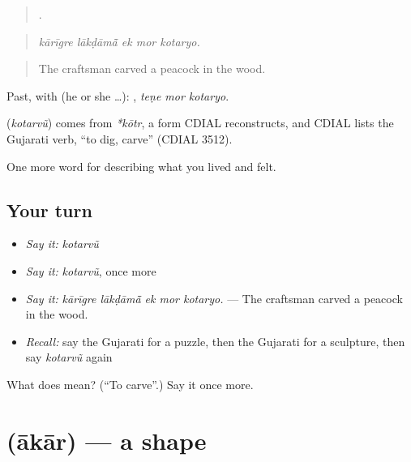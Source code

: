 \begin{quote}
    .
\end{quote}

\begin{quote}
\emph{kārīgre lākḍāmā̃ ek mor kotaryo.}
\end{quote}

\begin{quote}
The craftsman carved a peacock in the wood.
\end{quote}

Past, with  (he or she …):   , \emph{teṇe mor kotaryo}.

\begin{cousinweb}
\textbf{} (\emph{kotarvũ}) comes from \emph{*kōtr}, a form CDIAL reconstructs, and CDIAL lists the Gujarati verb, \textquotedblleft{}to dig, carve\textquotedblright{} (CDIAL 3512).
\end{cousinweb}

\begin{grammarlens}[title={What you've built}]
One more word for describing what you lived and felt.
\end{grammarlens}

\subsection*{Your turn}
\begin{itemize}
\raggedright
  \item \emph{Say it:} \emph{kotarvũ}
  \item \emph{Say it:} \emph{kotarvũ}, once more
  \item \emph{Say it:} \emph{kārīgre lākḍāmā̃ ek mor kotaryo.} — The craftsman carved a peacock in the wood.
  \item \emph{Recall:} say the Gujarati for a puzzle, then the Gujarati for a sculpture, then say \emph{kotarvũ} again
\end{itemize}

\begin{tcolorbox}[breakable,colback=teal!4,colframe=teal!35!black,title={Before you move on}]
What does  mean? (\textquotedblleft{}To carve\textquotedblright{}.) Say it once more.
\end{tcolorbox}
\section[\texorpdfstring{\gu{આકાર} (ākār)}{આકાર (ākār)}]{ (ākār) — a shape}

